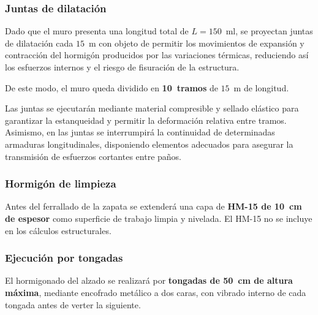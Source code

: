 \subsubsection{Juntas de dilatación}

Dado que el muro presenta una longitud total de $L = 150$~ml, se proyectan 
juntas de dilatación cada $15$~m con objeto de permitir los movimientos de 
expansión y contracción del hormigón producidos por las variaciones térmicas, 
reduciendo así los esfuerzos internos y el riesgo de fisuración de la estructura.

De este modo, el muro queda dividido en \textbf{10~tramos} de $15$~m de longitud.

Las juntas se ejecutarán mediante material compresible y sellado elástico para 
garantizar la estanqueidad y permitir la deformación relativa entre tramos. Asimismo, 
en las juntas se interrumpirá la continuidad de determinadas armaduras longitudinales, 
disponiendo elementos adecuados para asegurar la transmisión de esfuerzos cortantes 
entre paños.

\subsubsection{Hormigón de limpieza}

Antes del ferrallado de la zapata se extenderá una capa de
\textbf{HM-15 de 10~cm de espesor} como superficie de trabajo limpia y
nivelada. El HM-15 no se incluye en los cálculos estructurales.

\subsubsection{Ejecución por tongadas}

El hormigonado del alzado se realizará por \textbf{tongadas de 50~cm de
altura máxima}, mediante encofrado metálico a dos caras, con vibrado
interno de cada tongada antes de verter la siguiente.


